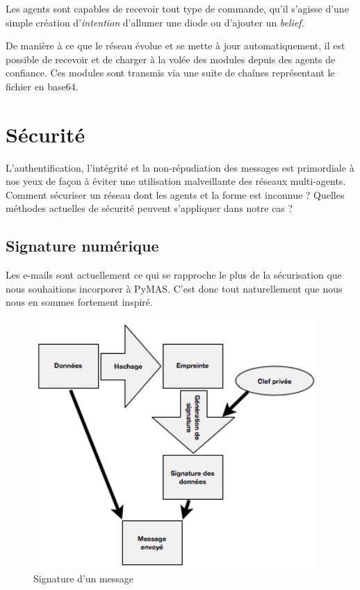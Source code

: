 \documentclass[11pt]{book}
\begin{document}
Les agents sont capables de recevoir tout type de commande, qu'il s'agisse 
d'une simple création d'\textit{intention} d'allumer une diode ou 
d'ajouter un \textit{belief}. 

De manière à ce que le réseau évolue et se mette à jour automatiquement, 
il est possible de recevoir et de charger à la volée des modules depuis des
agents de confiance. Ces modules sont transmis via une suite de chaînes 
représentant le fichier en base64.

\chapter{Sécurité}
L'authentification, l'intégrité et la non-répudiation des messages est 
primordiale à nos yeux de façon à éviter une utilisation malveillante des 
réseaux multi-agents. Comment sécuriser un réseau dont les agents et la 
forme est inconnue ? Quelles méthodes actuelles de sécurité peuvent 
s'appliquer dans notre cas ?

\section{Signature numérique}
Les e-mails sont actuellement ce qui se rapproche le plus de la sécurisation 
que nous souhaitions incorporer à PyMAS. C'est donc tout naturellement que 
nous nous en sommes fortement inspiré.

\begin{figure}[ht]
  \begin{center}
    \includegraphics[height=9.5cm]{imgs/signature.png}
    \caption{Signature d'un message}
  \end{center}
\end{figure}
\end{document}
